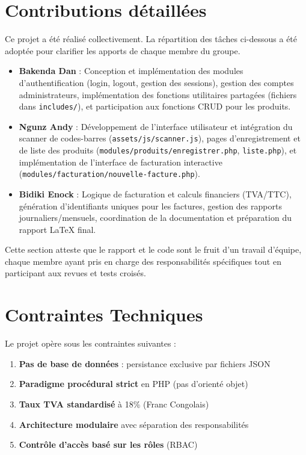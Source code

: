 \documentclass[12pt,a4paper]{report}
\begin{document}
\section{Contributions détaillées}

Ce projet a été réalisé collectivement. La répartition des tâches ci-dessous a été adoptée pour clarifier les apports de chaque membre du groupe.

\begin{itemize}
    \item \textbf{Bakenda Dan} : Conception et implémentation des modules d'authentification (login, logout, gestion des sessions), gestion des comptes administrateurs, implémentation des fonctions utilitaires partagées (fichiers dans \texttt{includes/}), et participation aux fonctions CRUD pour les produits.
    \item \textbf{Ngunz Andy} : Développement de l'interface utilisateur et intégration du scanner de codes-barres (\texttt{assets/js/scanner.js}), pages d'enregistrement et de liste des produits (\texttt{modules/produits/enregistrer.php}, \texttt{liste.php}), et implémentation de l'interface de facturation interactive (\texttt{modules/facturation/nouvelle-facture.php}).
    \item \textbf{Bidiki Enock} : Logique de facturation et calculs financiers (TVA/TTC), génération d'identifiants uniques pour les factures, gestion des rapports journaliers/mensuels, coordination de la documentation et préparation du rapport LaTeX final.
\end{itemize}

Cette section atteste que le rapport et le code sont le fruit d'un travail d'équipe, chaque membre ayant pris en charge des responsabilités spécifiques tout en participant aux revues et tests croisés.

\section{Contraintes Techniques}

Le projet opère sous les contraintes suivantes :

\begin{enumerate}
    \item \textbf{Pas de base de données} : persistance exclusive par fichiers JSON
    \item \textbf{Paradigme procédural strict} en PHP (pas d'orienté objet)
    \item \textbf{Taux TVA standardisé} à 18\% (Franc Congolais)
    \item \textbf{Architecture modulaire} avec séparation des responsabilités
    \item \textbf{Contrôle d'accès basé sur les rôles} (RBAC)
\end{enumerate}
\end{document}
